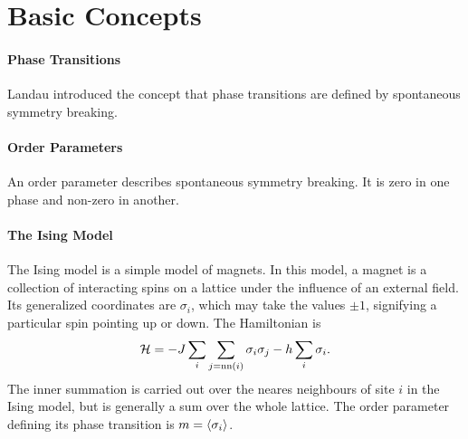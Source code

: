\section{Basic Concepts}

\paragraph{Phase Transitions}
Landau introduced the concept that phase transitions are defined by spontaneous symmetry breaking.

\paragraph{Order Parameters}
An order parameter describes spontaneous symmetry breaking. It is zero in one phase and non-zero in another.

\paragraph{The Ising Model}
The Ising model is a simple model of magnets. In this model, a magnet is a collection of interacting spins on a lattice under the influence of an external field. Its generalized coordinates are $\sigma_{i}$, which may take the values $\pm 1$, signifying a particular spin pointing up or down. The Hamiltonian is
\begin{align*}
	\mathcal{H} = -J\sum\limits_{i}\sum\limits_{j = \text{nn}(i)}\sigma_{i}\sigma_{j} - h\sum\limits_{i}\sigma_{i}.
\end{align*}
The inner summation is carried out over the neares neighbours of site $i$ in the Ising model, but is generally a sum over the whole lattice. The order parameter defining its phase transition is $m = \expval{\sigma_{i}}$.

